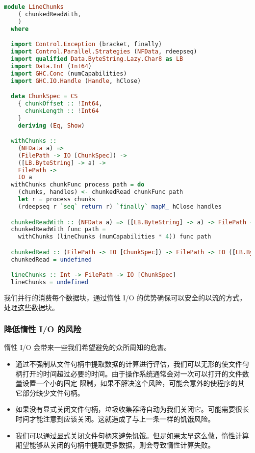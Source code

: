 \documentclass[./main.tex]{subfiles}
\begin{document}
\begin{lstlisting}[language=Haskell]
  module LineChunks
    ( chunkedReadWith,
    )
  where

  import Control.Exception (bracket, finally)
  import Control.Parallel.Strategies (NFData, rdeepseq)
  import qualified Data.ByteString.Lazy.Char8 as LB
  import Data.Int (Int64)
  import GHC.Conc (numCapabilities)
  import GHC.IO.Handle (Handle, hClose)

  data ChunkSpec = CS
    { chunkOffset :: !Int64,
      chunkLength :: !Int64
    }
    deriving (Eq, Show)

  withChunks ::
    (NFData a) =>
    (FilePath -> IO [ChunkSpec]) ->
    ([LB.ByteString] -> a) ->
    FilePath ->
    IO a
  withChunks chunkFunc process path = do
    (chunks, handles) <- chunkedRead chunkFunc path
    let r = process chunks
    (rdeepseq r `seq` return r) `finally` mapM_ hClose handles

  chunkedReadWith :: (NFData a) => ([LB.ByteString] -> a) -> FilePath -> IO a
  chunkedReadWith func path =
    withChunks (lineChunks (numCapabilities * 4)) func path

  chunkedRead :: (FilePath -> IO [ChunkSpec]) -> FilePath -> IO ([LB.ByteString], [Handle])
  chunkedRead = undefined

  lineChunks :: Int -> FilePath -> IO [ChunkSpec]
  lineChunks = undefined
\end{lstlisting}

我们并行的消费每个数据块，通过惰性 I/O 的优势确保可以安全的以流的方式，处理这些数据块。

\subsubsection*{降低惰性 I/O 的风险}

惰性 I/O 会带来一些我们希望避免的众所周知的危害。

\begin{itemize}
  \item 通过不强制从文件句柄中提取数据的计算进行评估，我们可以无形的使文件句柄打开的时间超过必要的时间。由于操作系统通常会对一次可以打开的文件数量设置一个小的固定
        限制，如果不解决这个风险，可能会意外的使程序的其它部分缺少文件句柄。
  \item 如果没有显式关闭文件句柄，垃圾收集器将自动为我们关闭它。可能需要很长时间才能注意到应该关闭。这就造成了与上一条一样的饥饿风险。
  \item 我们可以通过显式关闭文件句柄来避免饥饿。但是如果太早这么做，惰性计算期望能够从关闭的句柄中提取更多数据，则会导致惰性计算失败。
\end{itemize}
\end{document}
